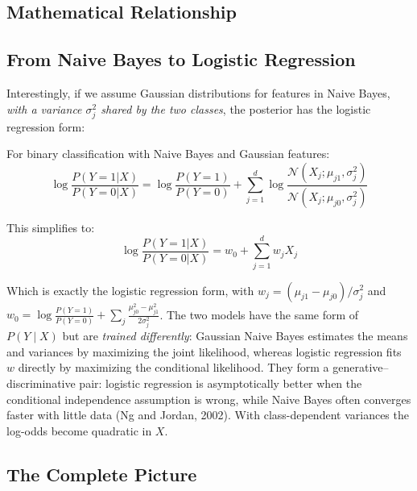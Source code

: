 \begin{notechapter}
\section{Mathematical Relationship}

\subsection{From Naive Bayes to Logistic Regression}

Interestingly, if we assume Gaussian distributions for features in Naive Bayes, \emph{with a variance \( \sigma_j^2 \) shared by the two classes}, the posterior has the logistic regression form:

For binary classification with Naive Bayes and Gaussian features:
\[
\log\frac{P(Y=1|X)}{P(Y=0|X)} = \log\frac{P(Y=1)}{P(Y=0)} + \sum_{j=1}^d \log\frac{\mathcal{N}(X_j;\mu_{j1},\sigma_j^2)}{\mathcal{N}(X_j;\mu_{j0},\sigma_j^2)}
\]

This simplifies to:
\[
\log\frac{P(Y=1|X)}{P(Y=0|X)} = w_0 + \sum_{j=1}^d w_j X_j
\]

Which is exactly the logistic regression form, with \( w_j = (\mu_{j1} - \mu_{j0})/\sigma_j^2 \) and \( w_0 = \log\frac{P(Y=1)}{P(Y=0)} + \sum_j \frac{\mu_{j0}^2 - \mu_{j1}^2}{2\sigma_j^2} \). The two models have the same form of \( P(Y \mid X) \) but are \emph{trained differently}: Gaussian Naive Bayes estimates the means and variances by maximizing the joint likelihood, whereas logistic regression fits \( w \) directly by maximizing the conditional likelihood. They form a generative--discriminative pair: logistic regression is asymptotically better when the conditional independence assumption is wrong, while Naive Bayes often converges faster with little data (Ng and Jordan, 2002). With class-dependent variances the log-odds become quadratic in \( X \).

\subsection{The Complete Picture}


\end{notechapter}
